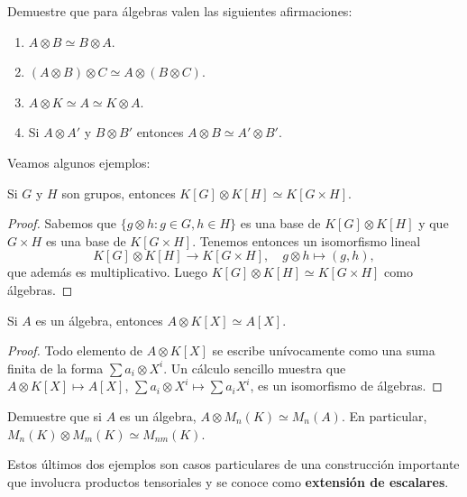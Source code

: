 \begin{exercise}
\begin{exercise}
	Demuestre que para álgebras valen las siguientes afirmaciones:
	\begin{enumerate}
		\item $A\otimes B\simeq B\otimes A$.
		\item $(A\otimes B)\otimes C\simeq A\otimes(B\otimes C)$.
		\item $A\otimes K\simeq A\simeq K\otimes A$.
		\item Si $A\otimes A'$ y $B\otimes B'$ entonces $A\otimes B\simeq A'\otimes B'$.
	\end{enumerate}
\end{exercise}

Veamos algunos ejemplos:

\begin{proposition}
	Si $G$ y $H$ son grupos, entonces $K[G]\otimes K[H]\simeq K[G\times H]$.
\end{proposition}

\begin{proof}
	Sabemos que $\{g\otimes h:g\in G,h\in H\}$ es una base de $K[G]\otimes K[H]$ y que
	$G\times H$ es una base de $K[G\times H]$. Tenemos entonces un isomorfismo lineal 
	\[
	K[G]\otimes K[H]\to K[G\times H], 
	\quad 
	g\otimes h\mapsto (g,h),
	\]
	que además es multiplicativo. Luego $K[G]\otimes K[H]\simeq K[G\times H]$
	como álgebras.
\end{proof}

\begin{proposition}
	Si $A$ es un álgebra, entonces $A\otimes K[X]\simeq A[X]$.	
\end{proposition}

\begin{proof}
	Todo elemento de $A\otimes K[X]$ se escribe unívocamente como una suma
	finita de la forma $\sum a_i\otimes X^i$. Un cálculo sencillo muestra que
	$A\otimes K[X]\mapsto A[X]$, $\sum a_i\otimes X^i\mapsto \sum a_iX^i$, es
	un isomorfismo de álgebras.
\end{proof}

\begin{exercise}
	Demuestre que si $A$ es un álgebra, $A\otimes M_n(K)\simeq M_n(A)$. En
	particular, $M_n(K)\otimes M_m(K)\simeq M_{nm}(K)$.
\end{exercise}

Estos últimos dos ejemplos son casos particulares de una construcción
importante que involucra productos tensoriales y se conoce como
\textbf{extensión de escalares}.


\end{exercise}

